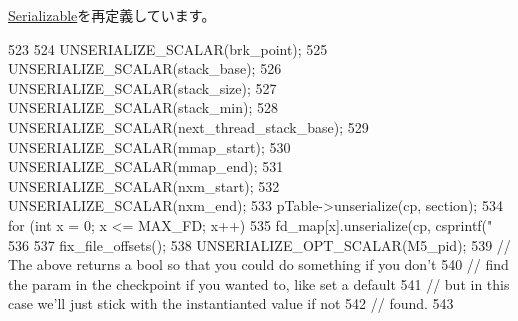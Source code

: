 \hyperlink{classSerializable_af100c4e9feabf3cd918619c88c718387}{Serializable}を再定義しています。


\begin{DoxyCode}
523 {
524     UNSERIALIZE_SCALAR(brk_point);
525     UNSERIALIZE_SCALAR(stack_base);
526     UNSERIALIZE_SCALAR(stack_size);
527     UNSERIALIZE_SCALAR(stack_min);
528     UNSERIALIZE_SCALAR(next_thread_stack_base);
529     UNSERIALIZE_SCALAR(mmap_start);
530     UNSERIALIZE_SCALAR(mmap_end);
531     UNSERIALIZE_SCALAR(nxm_start);
532     UNSERIALIZE_SCALAR(nxm_end);
533     pTable->unserialize(cp, section);
534     for (int x = 0; x <= MAX_FD; x++) {
535         fd_map[x].unserialize(cp, csprintf("%
536     }
537     fix_file_offsets();
538     UNSERIALIZE_OPT_SCALAR(M5_pid);
539     // The above returns a bool so that you could do something if you don't
540     // find the param in the checkpoint if you wanted to, like set a default
541     // but in this case we'll just stick with the instantianted value if not
542     // found.   
543 }
\end{DoxyCode}


